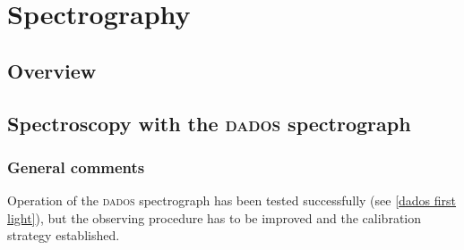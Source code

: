 \documentclass[a4paper, 11pt, fleqn]{memoir}
\begin{document}
\chapter{Spectrography}

\section{Overview}

\section{Spectroscopy with the \textsc{dados} spectrograph}\label{spectroscopy}

\subsection{General comments}

Operation of the \textsc{dados} spectrograph has been tested successfully (see \cref{dados first light}), but the observing procedure has to be improved and the calibration strategy established.
\end{document}

